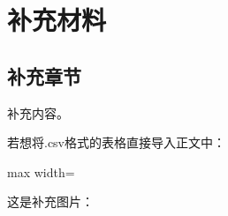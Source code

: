
\chapter{补充材料}


\section{补充章节}

补充内容。

若想将.csv格式的表格直接导入正文中：

\begin{table}
	\centering
	\caption{从csv文件中导入表格}
	\begin{adjustbox}{max width=\linewidth}
	\end{adjustbox}
	\label{tab:asterid}
\end{table}

这是补充图片：

